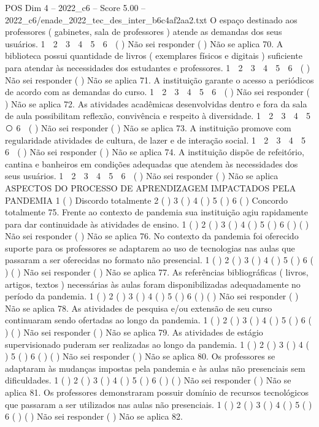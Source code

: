 \begin{textsample}{POS Dim 4 – 2022\_c6 – Score 5.00 – 2022\_c6/enade\_2022\_tec\_des\_inter\_b6c4af2aa2.txt}
O espaço destinado aos professores ( gabinetes, sala de professores ) atende as demandas dos seus usuários. 1 ⃝ 2 ⃝ 3 ⃝ 4 ⃝ 5 ⃝ 6 ⃝ ( ) Não sei responder ( ) Não se aplica 70.
A biblioteca possui quantidade de livros ( exemplares físicos e digitais ) suficiente para atendar às necessidades dos estudantes e professores. 1 ⃝ 2 ⃝ 3 ⃝ 4 ⃝ 5 ⃝ 6 ⃝ ( ) Não sei responder ( ) Não se aplica 71.
A instituição garante o acesso a periódicos de acordo com as demandas do curso. 1 ⃝ 2 ⃝ 3 ⃝ 4 ⃝ 5 ⃝ 6 ⃝ ( ) Não sei responder ( ) Não se aplica 72.
As atividades acadêmicas desenvolvidas dentro e fora da sala de aula possibilitam reflexão, convivência e respeito à diversidade. 1 ⃝ 2 ⃝ 3 ⃝ 4 ⃝ 5 ⃝ 6 ⃝ ( ) Não sei responder ( ) Não se aplica 73.
A instituição promove com regularidade atividades de cultura, de lazer e de interação social. 1 ⃝ 2 ⃝ 3 ⃝ 4 ⃝ 5 ⃝ 6 ⃝ ( ) Não sei responder ( ) Não se aplica 74.
A instituição dispõe de refeitório, cantina e banheiros em condições adequadas que atendem às necessidades dos seus usuários. 1 ⃝ 2 ⃝ 3 ⃝ 4 ⃝ 5 ⃝ 6 ⃝ ( ) Não sei responder ( ) Não se aplica ASPECTOS DO PROCESSO DE APRENDIZAGEM IMPACTADOS PELA PANDEMIA 1 ( ) Discordo totalmente 2 ( ) 3 ( ) 4 ( ) 5 ( ) 6 ( ) Concordo totalmente 75.
Frente ao contexto de pandemia sua instituição agiu rapidamente para dar continuidade às atividades de ensino. 1 ( ) 2 ( ) 3 ( ) 4 ( ) 5 ( ) 6 ( ) ( ) Não sei responder ( ) Não se aplica 76.
No contexto da pandemia foi oferecido suporte para os professores se adaptarem ao uso de tecnologias nas aulas que passaram a ser oferecidas no formato não presencial. 1 ( ) 2 ( ) 3 ( ) 4 ( ) 5 ( ) 6 ( ) ( ) Não sei responder ( ) Não se aplica 77.
As referências bibliográficas ( livros, artigos, textos ) necessárias às aulas foram disponibilizadas adequadamente no período da pandemia. 1 ( ) 2 ( ) 3 ( ) 4 ( ) 5 ( ) 6 ( ) ( ) Não sei responder ( ) Não se aplica 78.
As atividades de pesquisa e/ou extensão de seu curso continuaram sendo ofertadas ao longo da pandemia. 1 ( ) 2 ( ) 3 ( ) 4 ( ) 5 ( ) 6 ( ) ( ) Não sei responder ( ) Não se aplica 79.
As atividades de estágio supervisionado puderam ser realizadas ao longo da pandemia. 1 ( ) 2 ( ) 3 ( ) 4 ( ) 5 ( ) 6 ( ) ( ) Não sei responder ( ) Não se aplica 80.
Os professores se adaptaram às mudanças impostas pela pandemia e às aulas não presenciais sem dificuldades. 1 ( ) 2 ( ) 3 ( ) 4 ( ) 5 ( ) 6 ( ) ( ) Não sei responder ( ) Não se aplica 81.
Os professores demonstraram possuir domínio de recursos tecnológicos que passaram a ser utilizados nas aulas não presenciais. 1 ( ) 2 ( ) 3 ( ) 4 ( ) 5 ( ) 6 ( ) ( ) Não sei responder ( ) Não se aplica 82.

\end{textsample}
